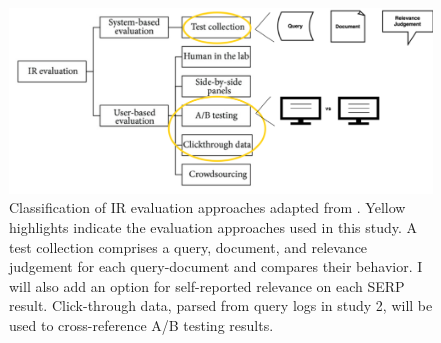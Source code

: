 \begin{figure}[H]
    \centering
    \includegraphics[width=1\textwidth]{../figures/Methods_Evaluation.png}
    \caption{Classification of IR evaluation approaches adapted from \cite{Samimi2014}. Yellow highlights indicate the evaluation approaches used in this study. A test collection comprises a query, document, and relevance judgement for each query-document and compares their behavior. I will also add an option for self-reported relevance on each SERP result. Click-through data, parsed from query logs in study 2, will be used to cross-reference A/B testing results.}
    \label{fig:Methods_Evaluation}
\end{figure}